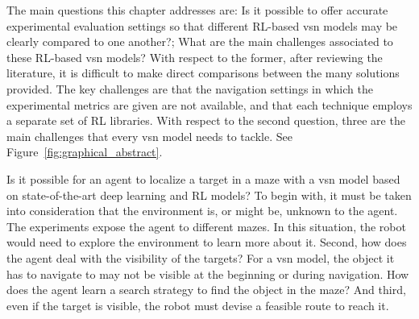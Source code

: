The main questions this chapter addresses are: Is it possible to offer accurate experimental evaluation settings so that different RL-based \acrshort{vsn} models may be clearly compared to one another?; What are the main challenges associated to these RL-based \acrshort{vsn} models?
With respect to the former, after reviewing the literature, it is difficult to make direct comparisons between the many solutions provided.
The key challenges are that the navigation settings in which the experimental metrics are given are not available, and that each technique employs a separate set of RL libraries.
With respect to the second question, three are the main challenges that every \acrshort{vsn} model needs to tackle.
See Figure~\ref{fig:graphical_abstract}.

Is it possible for an agent to localize a target in a maze with a \acrshort{vsn} model based on state-of-the-art deep learning and RL models?
To begin with, it must be taken into consideration that the environment is, or might be, unknown to the agent.
The experiments expose the agent to different mazes.
In this situation, the robot would need to explore the environment to learn more about it.
Second, how does the agent deal with the visibility of the targets?
For a \acrshort{vsn} model, the object it has to navigate to may not be visible at the beginning or during navigation.
How does the agent learn a search strategy to find the object in the maze?
And third, even if the target is visible, the robot must devise a feasible route to reach it.

